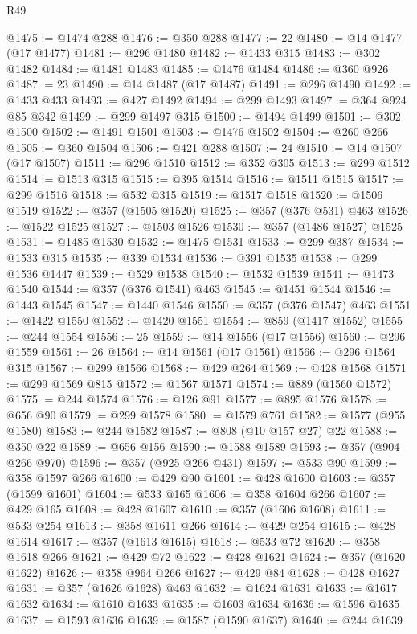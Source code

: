 \begin{lexlean}{R49}
\begin{coremodule}
@1475 := @1474 @288
@1476 := @350 @288
@1477 := 22
@1480 := @14 @1477 (@17 @1477)
@1481 := @296 @1480
@1482 := @1433 @315
@1483 := @302 @1482
@1484 := @1481 @1483
@1485 := @1476 @1484
@1486 := @360 @926
@1487 := 23
@1490 := @14 @1487 (@17 @1487)
@1491 := @296 @1490
@1492 := @1433 @433
@1493 := @427 @1492
@1494 := @299 @1493
@1497 := @364 @924 @85 @342
@1499 := @299 @1497 @315
@1500 := @1494 @1499
@1501 := @302 @1500
@1502 := @1491 @1501
@1503 := @1476 @1502
@1504 := @260 @266
@1505 := @360 @1504
@1506 := @421 @288
@1507 := 24
@1510 := @14 @1507 (@17 @1507)
@1511 := @296 @1510
@1512 := @352 @305
@1513 := @299 @1512
@1514 := @1513 @315
@1515 := @395 @1514
@1516 := @1511 @1515
@1517 := @299 @1516
@1518 := @532 @315
@1519 := @1517 @1518
@1520 := @1506 @1519
@1522 := @357 (@1505 @1520)
@1525 := @357 (@376 @531) @463
@1526 := @1522 @1525
@1527 := @1503 @1526
@1530 := @357 (@1486 @1527) @1525
@1531 := @1485 @1530
@1532 := @1475 @1531
@1533 := @299 @387
@1534 := @1533 @315
@1535 := @339 @1534
@1536 := @391 @1535
@1538 := @299 @1536 @1447
@1539 := @529 @1538
@1540 := @1532 @1539
@1541 := @1473 @1540
@1544 := @357 (@376 @1541) @463
@1545 := @1451 @1544
@1546 := @1443 @1545
@1547 := @1440 @1546
@1550 := @357 (@376 @1547) @463
@1551 := @1422 @1550
@1552 := @1420 @1551
@1554 := @859 (@1417 @1552)
@1555 := @244 @1554
@1556 := 25
@1559 := @14 @1556 (@17 @1556)
@1560 := @296 @1559
@1561 := 26
@1564 := @14 @1561 (@17 @1561)
@1566 := @296 @1564 @315
@1567 := @299 @1566
@1568 := @429 @264
@1569 := @428 @1568
@1571 := @299 @1569 @815
@1572 := @1567 @1571
@1574 := @889 (@1560 @1572)
@1575 := @244 @1574
@1576 := @126 @91
@1577 := @895 @1576
@1578 := @656 @90
@1579 := @299 @1578
@1580 := @1579 @761
@1582 := @1577 (@955 @1580)
@1583 := @244 @1582
@1587 := @808 (@10 @157 @27) @22
@1588 := @350 @22
@1589 := @656 @156
@1590 := @1588 @1589
@1593 := @357 (@904 @266 @970)
@1596 := @357 (@925 @266 @431)
@1597 := @533 @90
@1599 := @358 @1597 @266
@1600 := @429 @90
@1601 := @428 @1600
@1603 := @357 (@1599 @1601)
@1604 := @533 @165
@1606 := @358 @1604 @266
@1607 := @429 @165
@1608 := @428 @1607
@1610 := @357 (@1606 @1608)
@1611 := @533 @254
@1613 := @358 @1611 @266
@1614 := @429 @254
@1615 := @428 @1614
@1617 := @357 (@1613 @1615)
@1618 := @533 @72
@1620 := @358 @1618 @266
@1621 := @429 @72
@1622 := @428 @1621
@1624 := @357 (@1620 @1622)
@1626 := @358 @964 @266
@1627 := @429 @84
@1628 := @428 @1627
@1631 := @357 (@1626 @1628) @463
@1632 := @1624 @1631
@1633 := @1617 @1632
@1634 := @1610 @1633
@1635 := @1603 @1634
@1636 := @1596 @1635
@1637 := @1593 @1636
@1639 := @1587 (@1590 @1637)
@1640 := @244 @1639

\end{coremodule}
\end{lexlean}

